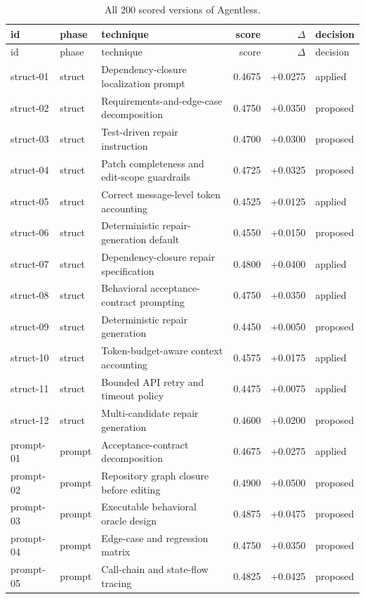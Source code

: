 \begin{center}\scriptsize\begin{longtable}{llp{5.2cm}rrl}
\caption{All 200 scored versions of Agentless.}\\
\toprule id & phase & technique & score & $\Delta$ & decision \\ \midrule \endfirsthead
\toprule id & phase & technique & score & $\Delta$ & decision \\ \midrule \endhead
struct-01 & struct & Dependency-closure localization prompt & 0.4675 & +0.0275 & applied \\
struct-02 & struct & Requirements-and-edge-case decomposition & 0.4750 & +0.0350 & proposed \\
struct-03 & struct & Test-driven repair instruction & 0.4700 & +0.0300 & proposed \\
struct-04 & struct & Patch completeness and edit-scope guardrails & 0.4725 & +0.0325 & proposed \\
struct-05 & struct & Correct message-level token accounting & 0.4525 & +0.0125 & applied \\
struct-06 & struct & Deterministic repair-generation default & 0.4550 & +0.0150 & proposed \\
struct-07 & struct & Dependency-closure repair specification & 0.4800 & +0.0400 & applied \\
struct-08 & struct & Behavioral acceptance-contract prompting & 0.4750 & +0.0350 & applied \\
struct-09 & struct & Deterministic repair generation & 0.4450 & +0.0050 & proposed \\
struct-10 & struct & Token-budget-aware context accounting & 0.4575 & +0.0175 & applied \\
struct-11 & struct & Bounded API retry and timeout policy & 0.4475 & +0.0075 & applied \\
struct-12 & struct & Multi-candidate repair generation & 0.4600 & +0.0200 & proposed \\
prompt-01 & prompt & Acceptance-contract decomposition & 0.4675 & +0.0275 & applied \\
prompt-02 & prompt & Repository graph closure before editing & 0.4900 & +0.0500 & proposed \\
prompt-03 & prompt & Executable behavioral oracle design & 0.4875 & +0.0475 & proposed \\
prompt-04 & prompt & Edge-case and regression matrix & 0.4750 & +0.0350 & proposed \\
prompt-05 & prompt & Call-chain and state-flow tracing & 0.4825 & +0.0425 & proposed \\

\end{longtable}
\end{center}
